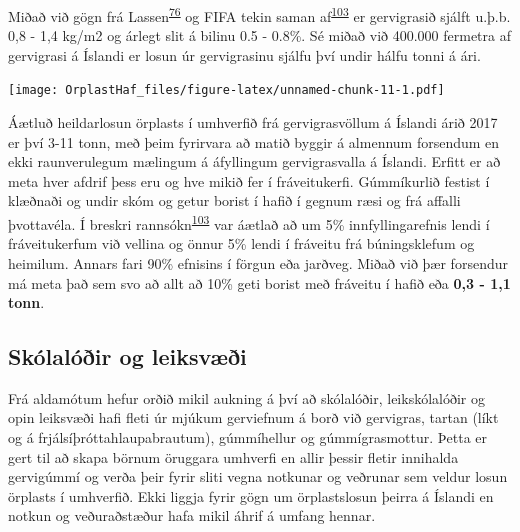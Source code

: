 \documentclass[icelandic,]{book}
\begin{document}
Miðað við gögn frá Lassen\textsuperscript{\protect\hyperlink{ref-lassen2015microplastics}{76}} og FIFA tekin saman af\textsuperscript{\protect\hyperlink{ref-Hann2018}{103}} er gervigrasið sjálft u.þ.b. 0,8 - 1,4 kg/m2 og árlegt slit á bilinu 0.5 - 0.8\%. Sé miðað við 400.000 fermetra af gervigrasi á Íslandi er losun úr gervigrasinu sjálfu því undir hálfu tonni á ári.

\texttt{[image: OrplastHaf\_files/figure-latex/unnamed-chunk-11-1.pdf]}

Áætluð heildarlosun örplasts í umhverfið frá gervigrasvöllum á Íslandi árið 2017 er því 3-11 tonn, með þeim fyrirvara að matið byggir á almennum forsendum en ekki raunverulegum mælingum á áfyllingum gervigrasvalla á Íslandi. Erfitt er að meta hver afdrif þess eru og hve mikið fer í fráveitukerfi. Gúmmíkurlið festist í klæðnaði og undir skóm og getur borist í hafið í gegnum ræsi og frá affalli þvottavéla. Í breskri rannsókn\textsuperscript{\protect\hyperlink{ref-Hann2018}{103}} var áætlað að um 5\% innfyllingarefnis lendi í fráveitukerfum við vellina og önnur 5\% lendi í fráveitu frá búningsklefum og heimilum. Annars fari 90\% efnisins í förgun eða jarðveg. Miðað við þær forsendur má meta það sem svo að allt að 10\% geti borist með fráveitu í hafið eða \textbf{0,3 - 1,1 tonn}.

\hypertarget{skolaloir-og-leiksvi}{%
\subsection*{Skólalóðir og leiksvæði}\label{skolaloir-og-leiksvi}}

Frá aldamótum hefur orðið mikil aukning á því að skólalóðir, leikskólalóðir og opin leiksvæði hafi fleti úr mjúkum gerviefnum á borð við gervigras, tartan (líkt og á frjálsíþróttahlaupabrautum), gúmmíhellur og gúmmígrasmottur. Þetta er gert til að skapa börnum öruggara umhverfi en allir þessir fletir innihalda gervigúmmí og verða þeir fyrir sliti vegna notkunar og veðrunar sem veldur losun örplasts í umhverfið. Ekki liggja fyrir gögn um örplastslosun þeirra á Íslandi en notkun og veðuraðstæður hafa mikil áhrif á umfang hennar.
\end{document}
